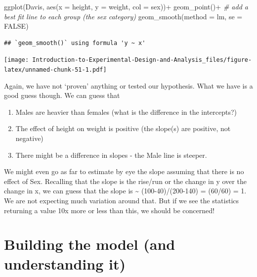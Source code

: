 \documentclass[
]{book}
\newenvironment{Shaded}{\begin{snugshade}}{\end{snugshade}}
\newcommand{\AttributeTok}[1]{\textcolor[rgb]{0.77,0.63,0.00}{#1}}
\newcommand{\CommentTok}[1]{\textcolor[rgb]{0.56,0.35,0.01}{\textit{#1}}}
\newcommand{\ConstantTok}[1]{\textcolor[rgb]{0.00,0.00,0.00}{#1}}
\newcommand{\FunctionTok}[1]{\textcolor[rgb]{0.00,0.00,0.00}{#1}}
\newcommand{\NormalTok}[1]{#1}
\newcommand{\SpecialCharTok}[1]{\textcolor[rgb]{0.00,0.00,0.00}{#1}}
\providecommand{\tightlist}{%
  \setlength{\itemsep}{0pt}\setlength{\parskip}{0pt}}
\begin{document}
\begin{Shaded}
\begin{Highlighting}[]
\FunctionTok{ggplot}\NormalTok{(Davis, }\FunctionTok{aes}\NormalTok{(}\AttributeTok{x =}\NormalTok{ height, }\AttributeTok{y =}\NormalTok{ weight, }\AttributeTok{col =}\NormalTok{ sex))}\SpecialCharTok{+}
  \FunctionTok{geom\_point}\NormalTok{()}\SpecialCharTok{+}
  \CommentTok{\# add a best fit line to each group (the sex category)}
  \FunctionTok{geom\_smooth}\NormalTok{(}\AttributeTok{method =}\NormalTok{ lm, }\AttributeTok{se =} \ConstantTok{FALSE}\NormalTok{)}
\end{Highlighting}
\end{Shaded}

\begin{verbatim}
## `geom_smooth()` using formula 'y ~ x'
\end{verbatim}

\texttt{[image: Introduction-to-Experimental-Design-and-Analysis\_files/figure-latex/unnamed-chunk-51-1.pdf]}

Again, we have not `proven' anything or tested our hypothesis. What we have is a good guess though. We can guess that

\begin{enumerate}
\def\labelenumi{\arabic{enumi}.}
\tightlist
\item
  Males are heavier than females (what is the difference in the intercepts?)
\item
  The effect of height on weight is positive (the slope(s) are positive, not negative)
\item
  There might be a difference in slopes - the Male line is steeper.
\end{enumerate}

We might even go as far to estimate by eye the slope assuming that there is no effect of Sex. Recalling that the slope is the rise/run or the change in y over the change in x, we can guess that the slope is \textasciitilde{} (100-40)/(200-140) = (60/60) = 1. We are not expecting much variation around that. But if we see the statistics returning a value 10x more or less than this, we should be concerned!

\hypertarget{building-the-model-and-understanding-it}{%
\section{Building the model (and understanding it)}\label{building-the-model-and-understanding-it}}
\end{document}
